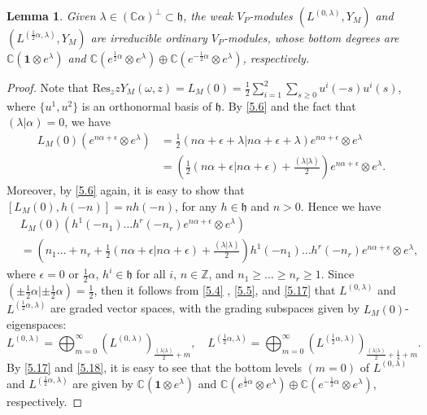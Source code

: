 \documentclass[12pt,a4paper,reqno]{amsart}
\numberwithin{equation}{section}
\numberwithin{equation}{section}
\newtheorem{lm}[thm]{Lemma}
\theoremstyle{definition}
\newcommand{\Z}{\mathbb{Z}}
\def \C {\mathbb{C}}
\def\la{\lambda}
\def \al{\alpha}
\def \om{\omega}
\def \op {\oplus}
\def \vac {\mathbf{1}}
\def \h {\mathfrak{h}}
\def\Res{\mathrm{Res}}
\def\ds{\dots}
\def\o{\otimes}
\begin{document}
	
	\begin{lm}\label{lm5.5}
		Given $\la\in (\C\al)^\perp\subset \h$, the weak $V_P$-modules $(L^{(0,\la)},Y_M)$ and $(L^{(\frac{1}{2}\al,\la)},Y_M)$ are irreducible ordinary $V_P$-modules, whose bottom degrees are $\C (\vac\otimes e^\la)$ and $\C (e^{\frac{1}{2}\al}\o e^\la)\op \C (e^{-\frac{1}{2}\al}\o e^\la)$, respectively. 
	\end{lm}
	\begin{proof} 
		Note that $\Res_{z}z Y_M(\om ,z)=L_M(0)=\frac{1}{2}\sum_{i=1}^2 \sum_{s\geq 0}u^i(-s)u^i(s)$, where $\{u^1,u^2\}$ is an orthonormal basis of $\h$. By \eqref{5.6} and the fact that $(\la|\al)=0$, we have 
		\begin{align*}
			L_M(0) (e^{n\al+\epsilon}\o e^\la)&=\frac{1}{2} (n\al+\epsilon+\la|n\al+\epsilon+\la) e^{n\al+\epsilon}\o e^\la\\
			&=\left(\frac{1}{2}(n\al+\epsilon|n\al+\epsilon)+\frac{(\la|\la)}{2}\right) e^{n\al+\epsilon}\o e^\la.
		\end{align*}
		Moreover, by \eqref{5.6} again, it is easy to show that $[L_M(0), h(-n)]=n h(-n)$, for any $h\in \h$ and $n>0$. Hence we have 
		\begin{equation}\label{5.17}
			\begin{aligned}
				&L_M(0)\left(h^1(-n_1)\ds h^r(-n_r)e^{n\al+\epsilon}\o e^\la\right)\\
				&=\left(n_1\ds+n_r+\frac{1}{2}(n\al+\epsilon|n\al+\epsilon)+\frac{(\la|\la)}{2}\right)h^1(-n_1)\ds h^r(-n_r)e^{n\al+\epsilon}\o e^\la,
			\end{aligned}
		\end{equation}
		where $\epsilon=0$ or $\frac{1}{2}\al$, $h^i\in \h$ for all $i$, $n\in \Z$, and $n_1\geq \ds \geq n_r\geq 1$. Since $(\pm \frac{1}{2}\al|\pm \frac{1}{2}\al)=\frac{1}{2}$, then it follows from \eqref{5.4} , \eqref{5.5}, and \eqref{5.17} that $L^{(0,\la)}$ and $L^{(\frac{1}{2}\al,\la)}$ are graded vector spaces, with the grading subspaces given by $L_{M}(0)$-eigenspaces: 
		\begin{equation}\label{5.18}
			L^{(0,\la)}=\bigoplus_{m=0}^\infty \left(L^{(0,\la)}\right)_{\frac{(\la|\la)}{2}+m},\quad L^{(\frac{1}{2}\al,\la)}=\bigoplus_{m=0}^\infty \left(L^{(\frac{1}{2}\al,\la)}\right)_{\frac{(\la|\la)}{2}+\frac{1}{4}+m}.
		\end{equation}
		By \eqref{5.17} and \eqref{5.18}, it is easy to see that the bottom levels $(m=0)$ of $L^{(0,\la)}$ and $L^{(\frac{1}{2}\al,\la)}$ are given by $\C (\vac\otimes e^\la)$ and $\C (e^{\frac{1}{2}\al}\o e^\la)\op \C (e^{-\frac{1}{2}\al}\o e^\la)$, respectively. 
		

\end{proof}
\end{document}
